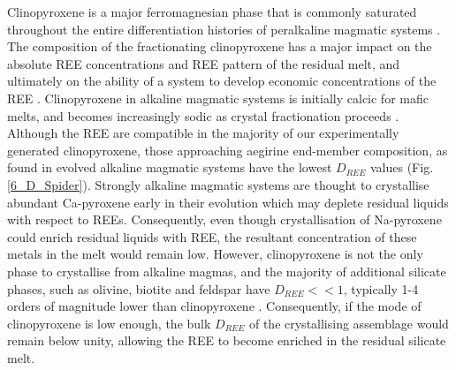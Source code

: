 \documentclass[final,authoryear,3p,times,twocolumn]{elsarticle}
\begin{document}
	Clinopyroxene is a major ferromagnesian phase that is commonly saturated throughout the entire differentiation histories of peralkaline magmatic systems \citep{Ablay1998,Marks2001a,Moller2016}. The composition of the fractionating clinopyroxene has a major impact on the absolute REE concentrations and REE pattern of the residual melt, and ultimately on the ability of a system to develop economic concentrations of the REE \citep[Fig. \ref{15_Fract_Cryst}, e.g.][]{Kogarko1990, Sorensen1992, Marks2011}.
Clinopyroxene in alkaline magmatic systems is initially calcic for mafic melts, and becomes increasingly sodic as crystal fractionation proceeds \citep{Marks2004}. Although the REE are compatible in the majority of our experimentally generated clinopyroxene, those approaching aegirine end-member composition, as found in evolved alkaline magmatic systems have the lowest $D_{REE}$ values (Fig. \ref{6_D_Spider}). Strongly alkaline magmatic systems are thought to crystallise abundant Ca-pyroxene early in their evolution which may deplete residual liquids with respect to REEs. Consequently, even though crystallisation of Na-pyroxene could enrich residual liquids with REE, the resultant concentration of these metals in the melt would remain low. 
    However, clinopyroxene is not the only phase to crystallise from alkaline magmas, and the majority of additional silicate phases, such as olivine, biotite and feldspar have $D_{REE} << 1$, typically 1-4 orders of magnitude lower than clinopyroxene \citep{Larsen1979,Kovalenko1988, Mahood1990,Fedele2015}.
     Consequently, if the mode of clinopyroxene is low enough, the bulk $D_{REE}$ of the crystallising assemblage would remain below unity, allowing the REE to become enriched in the residual silicate melt.


\end{document}
